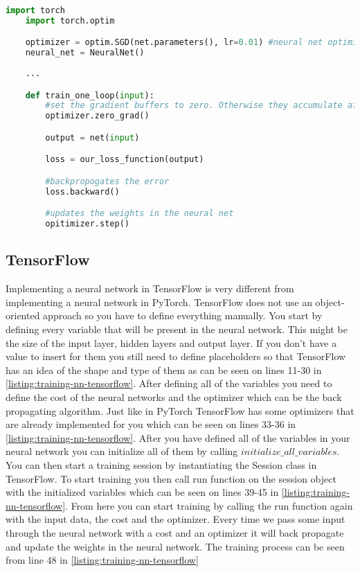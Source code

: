 \begin{lstlisting}[language=Python, caption={Training neural network in PyTorch}, captionpos=b, label={listing:training-nn-pytorch}]
	import torch
	import torch.optim

	optimizer = optim.SGD(net.parameters(), lr=0.01) #neural net optimizer using SGD update rules
	neural_net = NeuralNet()
	
	...

	def train_one_loop(input):
		#set the gradient buffers to zero. Otherwise they accumulate after every loop
		optimizer.zero_grad() 

		output = net(input)

		loss = our_loss_function(output)

		#backpropogates the error
		loss.backward() 

		#updates the weights in the neural net
		opitimizer.step() 

\end{lstlisting}

\subsection{TensorFlow}
Implementing a neural network in TensorFlow is very different from implementing a neural network in PyTorch.
TensorFlow does not use an object-oriented approach so you have to define everything manually.
You start by defining every variable that will be present in the neural network.
This might be the size of the input layer, hidden layers and output layer.
If you don't have a value to insert for them you still need to define placeholders so that TensorFlow has an idea of the shape and type of them as can be seen on lines 11-30 in \autoref{listing:training-nn-tensorflow}.
After defining all of the variables you need to define the cost of the neural networks and the optimizer which can be the back propagating algorithm.
Just like in PyTorch TensorFlow has some optimizers that are already implemented for you which can be seen on lines 33-36 in \autoref{listing:training-nn-tensorflow}. 
After you have defined all of the variables in your neural network you can initialize all of them by calling \textit{$initialize\_all\_variables$}.
You can then start a training session by instantiating the Session class in TensorFlow.
To start training you then call run function on the session object with the initialized variables which can be seen on lines 39-45 in \autoref{listing:training-nn-tensorflow}.
From here you can start training by calling the run function again with the input data, the cost and the optimizer.
Every time we pass some input through the neural network with a cost and an optimizer it will back propagate and update the weights in the neural network.
The training process can be seen from line 48 in \autoref{listing:training-nn-tensorflow}

